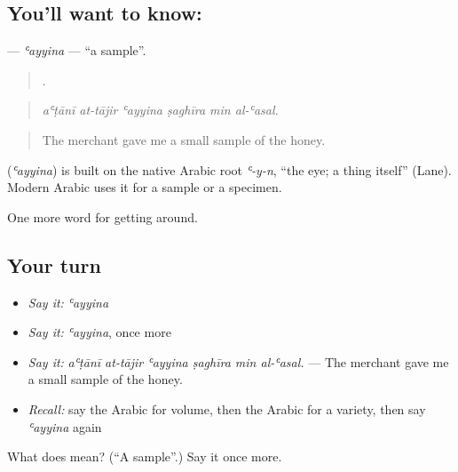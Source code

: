 \subsection*{You'll want to know: }
\textbf{} — \emph{ʿayyina} — \textquotedblleft{}a sample\textquotedblright{}.

\begin{quote}
     .
\end{quote}

\begin{quote}
\emph{aʿṭānī at-tājir ʿayyina ṣaghīra min al-ʿasal.}
\end{quote}

\begin{quote}
The merchant gave me a small sample of the honey.
\end{quote}

\begin{cousinweb}
\textbf{} (\emph{ʿayyina}) is built on the native Arabic root \emph{ʿ-y-n}, \textquotedblleft{}the eye; a thing itself\textquotedblright{} (Lane). Modern Arabic uses it for a sample or a specimen.
\end{cousinweb}

\begin{grammarlens}[title={What you've built}]
One more word for getting around.
\end{grammarlens}

\subsection*{Your turn}
\begin{itemize}
\raggedright
  \item \emph{Say it:} \emph{ʿayyina}
  \item \emph{Say it:} \emph{ʿayyina}, once more
  \item \emph{Say it:} \emph{aʿṭānī at-tājir ʿayyina ṣaghīra min al-ʿasal.} — The merchant gave me a small sample of the honey.
  \item \emph{Recall:} say the Arabic for volume, then the Arabic for a variety, then say \emph{ʿayyina} again
\end{itemize}

\begin{tcolorbox}[breakable,colback=teal!4,colframe=teal!35!black,title={Before you move on}]
What does  mean? (\textquotedblleft{}A sample\textquotedblright{}.) Say it once more.
\end{tcolorbox}
